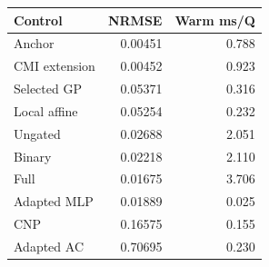 \begin{tabular}{lrr}
\toprule
Control & NRMSE & Warm ms/Q \\
\midrule
Anchor & 0.00451 & 0.788 \\
CMI extension & 0.00452 & 0.923 \\
Selected GP & 0.05371 & 0.316 \\
Local affine & 0.05254 & 0.232 \\
Ungated & 0.02688 & 2.051 \\
Binary & 0.02218 & 2.110 \\
Full & 0.01675 & 3.706 \\
Adapted MLP & 0.01889 & 0.025 \\
CNP & 0.16575 & 0.155 \\
Adapted AC & 0.70695 & 0.230 \\
\bottomrule
\end{tabular}
